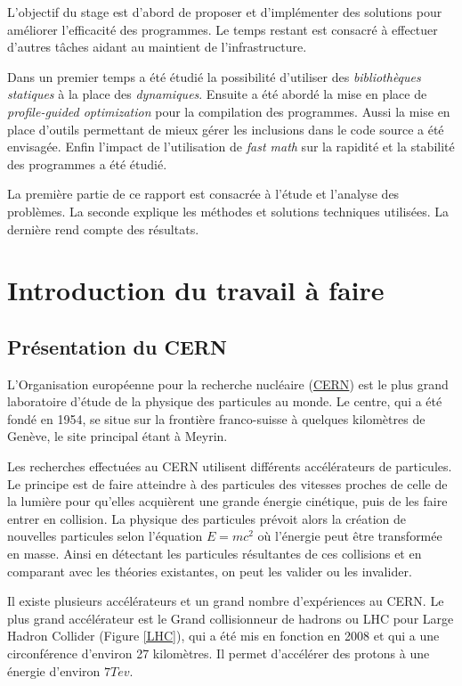 \documentclass[a4paper,11pt]{report}
\begin{document}
L'objectif du stage est d'abord de proposer et d'implémenter des solutions pour améliorer l'efficacité des programmes.
Le temps restant est consacré à effectuer d'autres tâches aidant au maintient de l'infrastructure.

Dans un premier temps a été étudié la possibilité d'utiliser des \emph{bibliothèques statiques} à la place des \emph{dynamiques}.
Ensuite a été abordé la mise en place de \emph{profile-guided optimization} pour la compilation des programmes.
Aussi la mise en place d'outils permettant de mieux gérer les inclusions dans le code source a été envisagée.
Enfin l'impact de l'utilisation de \emph{fast math} sur la rapidité et la stabilité des programmes a été étudié.

La première partie de ce rapport est consacrée à l'étude et l'analyse des problèmes.
La seconde explique les méthodes et solutions techniques utilisées.
La dernière rend compte des résultats.


\chapter{Introduction du travail à faire}
\section{Présentation du CERN}
L'Organisation européenne pour la recherche nucléaire (\href{https://home.cern/}{CERN}) est le plus grand laboratoire d'étude de la physique des particules au monde.
Le centre, qui a été fondé en 1954, se situe sur la frontière franco-suisse à quelques kilomètres de Genève, le site principal étant à Meyrin.

Les recherches effectuées au CERN utilisent différents accélérateurs de particules.
Le principe est de faire atteindre à des particules des vitesses proches de celle de la lumière pour qu'elles acquièrent une grande énergie cinétique, puis de les faire entrer en collision.
La physique des particules prévoit alors la création de nouvelles particules selon l'équation $E=mc^2$ où l'énergie peut être transformée en masse.
Ainsi en détectant les particules résultantes de ces collisions et en comparant avec les théories existantes, on peut les valider ou les invalider.

Il existe plusieurs accélérateurs et un grand nombre d'expériences au CERN.
Le plus grand accélérateur est le Grand collisionneur de hadrons ou LHC pour Large Hadron Collider (Figure \ref{LHC}), qui a été mis en fonction en 2008 et qui a une circonférence d'environ 27 kilomètres.
Il permet d'accélérer des protons à une énergie d'environ $7 Tev$.
\end{document}
